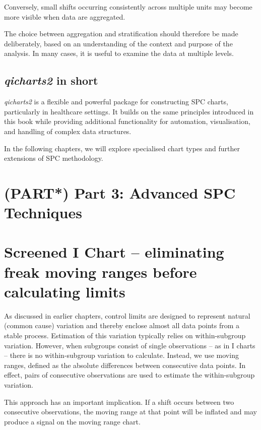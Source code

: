 \documentclass[
]{book}
\begin{document}
Conversely, small shifts occurring consistently across multiple units
may become more visible when data are aggregated.

The choice between aggregation and stratification should therefore be
made deliberately, based on an understanding of the context and purpose
of the analysis. In many cases, it is useful to examine the data at
multiple levels.

\section{\texorpdfstring{\emph{qicharts2} in
short}{qicharts2 in short}}\label{qicharts2-in-short}

\emph{qicharts2} is a flexible and powerful package for constructing SPC
charts, particularly in healthcare settings. It builds on the same
principles introduced in this book while providing additional
functionality for automation, visualisation, and handling of complex
data structures.

In the following chapters, we will explore specialised chart types and
further extensions of SPC methodology.

\chapter*{(PART*) Part 3: Advanced SPC
Techniques}\label{part-part-3-advanced-spc-techniques}

\chapter{Screened I Chart -- eliminating freak moving ranges before
calculating limits}\label{screenedmr}

As discussed in earlier chapters, control limits are designed to
represent natural (common cause) variation and thereby enclose almost
all data points from a stable process. Estimation of this variation
typically relies on within-subgroup variation. However, when subgroups
consist of single observations -- as in I charts -- there is no
within-subgroup variation to calculate. Instead, we use moving ranges,
defined as the absolute differences between consecutive data points. In
effect, pairs of consecutive observations are used to estimate the
within-subgroup variation.

This approach has an important implication. If a shift occurs between
two consecutive observations, the moving range at that point will be
inflated and may produce a signal on the moving range chart.
\end{document}
